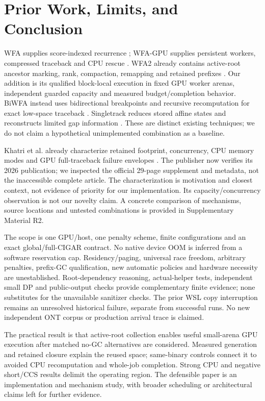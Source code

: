\documentclass[conference,a4paper]{IEEEtran}
\begin{document}
\section{Prior Work, Limits, and Conclusion}
WFA supplies score-indexed recurrence \cite{wfa2021}; WFA-GPU supplies persistent workers, compressed traceback and CPU rescue \cite{wfagpu2023}. WFA2 already contains active-root ancestor marking, rank, compaction, remapping and retained prefixes \cite{wfa2lib2026}. Our addition is its qualified block-local execution in fixed GPU worker arenas, independent guarded capacity and measured budget/completion behavior. BiWFA instead uses bidirectional breakpoints and recursive recomputation for exact low-space traceback \cite{biwfa2023}. Singletrack reduces stored affine states and reconstructs limited gap information \cite{singletrack2026}. These are distinct existing techniques; we do not claim a hypothetical unimplemented combination as a baseline.

Khatri et al. already characterize retained footprint, concurrency, CPU memory modes and GPU full-traceback failure envelopes \cite{characterisation2026}. The publisher now verifies its 2026 publication; we inspected the official 29-page supplement and metadata, not the inaccessible complete article. The characterization is motivation and closest context, not evidence of priority for our implementation. Its capacity/concurrency observation is not our novelty claim. A concrete comparison of mechanisms, source locations and untested combinations is provided in Supplementary Material R2.

The scope is one GPU/host, one penalty scheme, finite configurations and an exact global/full-CIGAR contract. No native device OOM is inferred from a software reservation cap. Residency/paging, universal race freedom, arbitrary penalties, prefix-GC qualification, new automatic policies and hardware necessity are unestablished. Root-dependency reasoning, actual-helper tests, independent small DP and public-output checks provide complementary finite evidence; none substitutes for the unavailable sanitizer checks. The prior WSL copy interruption remains an unresolved historical failure, separate from successful runs. No new independent ONT corpus or production arrival trace is claimed.

The practical result is that active-root collection enables useful small-arena GPU execution after matched no-GC alternatives are considered. Measured generation and retained closure explain the reused space; same-binary controls connect it to avoided CPU recomputation and whole-job completion. Strong CPU and negative short/CCS results delimit the operating region. The defensible paper is an implementation and mechanism study, with broader scheduling or architectural claims left for further evidence.
\end{document}
